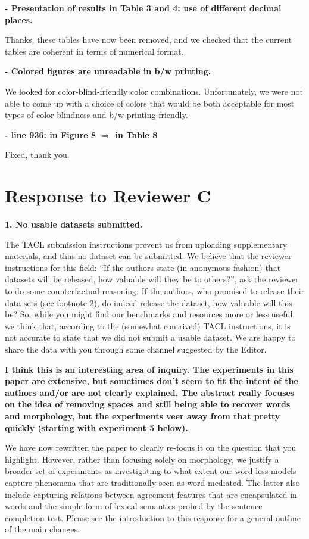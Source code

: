 \documentclass{article}
\begin{document}
\textbf{- Presentation of results in Table 3 and 4: use of different decimal places.}

Thanks, these tables have now been removed, and we checked that the current tables are coherent in terms of numerical format.
\newline

\textbf{- Colored figures are unreadable in b/w printing.}

We looked for color-blind-friendly color combinations. Unfortunately, we were not able to come up with a choice of colors that would be both acceptable for most types of color blindness and b/w-printing friendly.
\newline


\textbf{- line 936: in Figure 8 $\Rightarrow$ in Table 8}

Fixed, thank you.


\section{Response to Reviewer C}

\textbf{1. No usable datasets submitted.}

The TACL submission instructions prevent us from uploading supplementary materials, and thus no dataset can be submitted. We believe that the reviewer instructions for this field: ``If the authors state (in anonymous fashion) that datasets will be released, how valuable will they be to others?'', ask the reviewer to do some counterfactual reasoning: If the authors, who promised to release their data sets (see footnote 2), do indeed release the dataset, how valuable will this be? So, while you might find our benchmarks and resources more or less useful, we think that, according to the (somewhat contrived) TACL instructions, it is not accurate to state that we did not submit a usable dataset. We are happy to share the data with you through some channel suggested by the Editor.
\newline

\textbf{I think this is an interesting area of inquiry.  The experiments in this paper are extensive, but sometimes don't seem to fit the intent of the authors and/or are not clearly explained.  The abstract really focuses on the idea of removing spaces and still being able to recover words and morphology, but the experiments veer away from that pretty quickly (starting with experiment 5 below).}

We have now rewritten the paper to clearly re-focus it on the question that you highlight. However, rather than focusing solely on morphology, we justify a broader set of experiments as investigating to what extent our word-less models capture phenomena that are traditionally seen as word-mediated. The latter also include capturing relations between agreement features that are encapsulated in words and the simple form of lexical semantics probed by the sentence completion test. Please see the introduction to this response for a general outline of the main changes.
\newline
\end{document}
